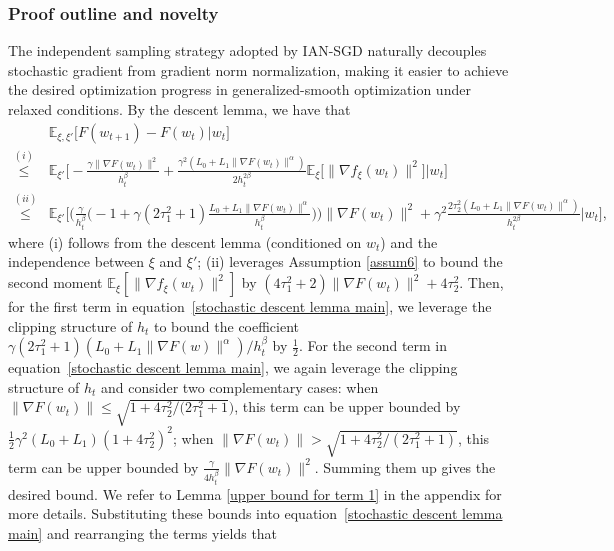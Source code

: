 \documentclass[10pt]{article} %
\def\eqref#1{equation~\ref{#1}}
\begin{document}
\subsubsection{Proof outline and novelty} 
The independent sampling strategy adopted by IAN-SGD naturally decouples stochastic gradient from gradient norm normalization, making it easier to achieve the desired optimization progress in generalized-smooth optimization under relaxed conditions.
By the descent lemma, we have that
\begin{align}
    &\mathbb{E}_{\xi,\xi'}\big [F(w_{t+1}) -F(w_t)|w_t\big]
    \nonumber\\
    \overset{(i)}{\leq}&\mathbb{E}_{\xi'}\Big[-\frac{ \gamma \big \| \nabla F(w_t)\big \|^2}{h_t^{\beta}}+\frac{\gamma^2(L_0
    + L_1\big \|\nabla F(w_t) \big \|^\alpha)}{2h_t^{2\beta}} \mathbb{E}_{\xi}\big [\big \|\nabla f_{\xi}(w_t)\big \|^2 \big]|w_t\Big] \nonumber \\
    \overset{(ii)}{\leq}& \mathbb{E}_{\xi'}\Big[ \Big(\frac{\gamma}{h_t^{\beta}}\big(-1+\gamma(2\tau_1^2+1) \frac{L_0+L_1 \big \|\nabla F(w_t) \big \|^{\alpha}}{h_t^{\beta}}\big)\Big) \|\nabla F(w_t) \big \|^2 +\gamma^2\frac{2\tau_2^2(L_0+L_1 \big \|\nabla F(w_t) \big \|^{\alpha})}{h_t^{2\beta}}|w_t\Big],
    \label{stochastic descent lemma main}
\end{align}
where (i) follows from the descent lemma (conditioned on $w_t$) and the independence between $\xi$ and $\xi'$; (ii) leverages Assumption \ref{assum6} to bound the second moment $\mathbb{E}_{\xi}[\|\nabla f_{\xi}(w_t) \|^2 ]$ by 
$(4\tau_1^2+2) \|\nabla F(w_t) \|^2+ 4\tau_2^2$.
Then, for the first term in \eqref{stochastic descent lemma main}, we leverage the clipping structure of $h_t$ to bound
the coefficient $\gamma(2\tau_1^2+1)(L_0+L_1 \|\nabla F(w) \|^{\alpha})/h_t^{\beta}$ by $\frac{1}{2}$. For the second term in \eqref{stochastic descent lemma main}, we again leverage the clipping structure of $h_t$ and consider two complementary cases: when $\|\nabla F(w_t) \|\leq \sqrt{1+4\tau_2^2/(2\tau_1^2+1})$, this term can be upper bounded by $\frac{1}{2}\gamma^2(L_0+L_1)(1+4\tau_2^2)^2$; when $\|\nabla F(w_t) \|> \sqrt{1+4\tau_2^2/(2\tau_1^2+1)}$, this term can be upper bounded by $\frac{\gamma}{4h_t^{\beta}}\|\nabla F(w_t) \|^2$. Summing them up gives the desired bound. We refer to Lemma \ref{upper bound for term 1} in the appendix for more details.
Substituting these bounds into \eqref{stochastic descent lemma main} and rearranging the terms yields that
\end{document}
